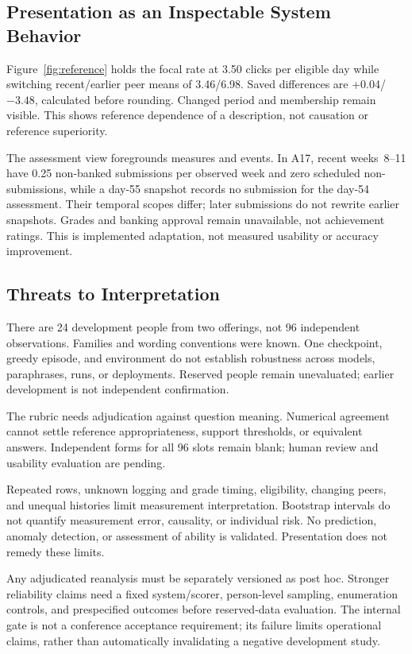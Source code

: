 \subsection{Presentation as an Inspectable System Behavior}
Figure~\ref{fig:reference} holds the focal rate at 3.50 clicks per eligible day while switching recent/earlier peer means of 3.46/6.98. Saved differences are +0.04/$-3.48$, calculated before rounding. Changed period and membership remain visible. This shows reference dependence of a description, not causation or reference superiority.

The assessment view foregrounds measures and events. In A17, recent weeks~8--11 have 0.25 non-banked submissions per observed week and zero scheduled non-submissions, while a day-55 snapshot records no submission for the day-54 assessment. Their temporal scopes differ; later submissions do not rewrite earlier snapshots. Grades and banking approval remain unavailable, not achievement ratings. This is implemented adaptation, not measured usability or accuracy improvement.

\subsection{Threats to Interpretation}
There are 24 development people from two offerings, not 96 independent observations. Families and wording conventions were known. One checkpoint, greedy episode, and environment do not establish robustness across models, paraphrases, runs, or deployments. Reserved people remain unevaluated; earlier development is not independent confirmation.

The rubric needs adjudication against question meaning. Numerical agreement cannot settle reference appropriateness, support thresholds, or equivalent answers. Independent forms for all 96 slots remain blank; human review and usability evaluation are pending.

Repeated rows, unknown logging and grade timing, eligibility, changing peers, and unequal histories limit measurement interpretation. Bootstrap intervals do not quantify measurement error, causality, or individual risk. No prediction, anomaly detection, or assessment of ability is validated. Presentation does not remedy these limits.

Any adjudicated reanalysis must be separately versioned as post hoc. Stronger reliability claims need a fixed system/scorer, person-level sampling, enumeration controls, and prespecified outcomes before reserved-data evaluation. The internal gate is not a conference acceptance requirement; its failure limits operational claims, rather than automatically invalidating a negative development study.
